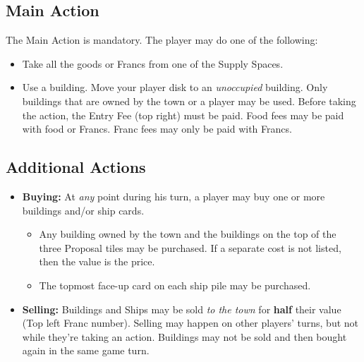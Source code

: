 \documentclass[12pt]{article}
\newenvironment{itemizeCustom}
{\begin{itemize}
  \setlength{\itemsep}{1pt}
  \setlength{\parskip}{0pt}
  \setlength{\parsep}{0pt}}
{\end{itemize}}
\begin{document}
\begin{multicols*}{2}
\subsection*{Main Action}
The Main Action is mandatory. The player may do one of the following:
\begin{itemizeCustom}
	\item Take all the goods or Francs from one of the Supply Spaces.
	\item Use a building. Move your player disk to an \emph{unoccupied} building. Only buildings that are owned by the town or a player may be used. Before taking the action, the Entry Fee (top right) must be paid. Food fees may be paid with food or Francs. Franc fees may only be paid with Francs.
\end{itemizeCustom}

\subsection*{Additional Actions}
\begin{itemizeCustom}
	\item \textbf{Buying:} At \emph{any} point during his turn, a player may buy one or more buildings and/or ship cards.
		\begin{itemizeCustom}
			\item Any building owned by the town and the buildings on the top of the three Proposal tiles may be purchased. If a separate cost is not listed, then the value is the price.
			\item The topmost face-up card on each ship pile may be purchased.
		\end{itemizeCustom}
	\item \textbf{Selling:} Buildings and Ships may be sold \emph{to the town} for \textbf{half} their value (Top left Franc number). Selling may happen on other players' turns, but not while they're taking an action. Buildings may not be sold and then bought again in the same game turn.
\end{itemizeCustom}


\end{multicols*}
\end{document}
